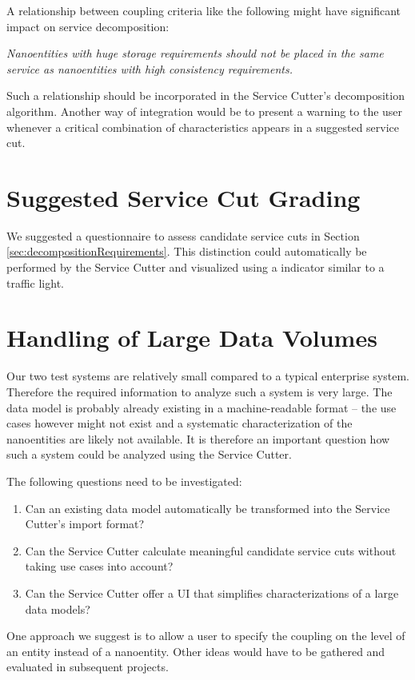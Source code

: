 A relationship between coupling criteria like the following might have significant impact on service decomposition:

\textit{Nanoentities with huge storage requirements should not be placed in the same service as nanoentities with high consistency requirements.}

Such a relationship should be incorporated in the Service Cutter's decomposition algorithm. Another way of integration would be to present a warning to the user whenever a critical combination of characteristics appears in a suggested service cut.

\section{Suggested Service Cut Grading}
\label{sec:suggested-cut-grades}

We suggested a questionnaire to assess candidate service cuts in Section \ref{sec:decompositionRequirements}. This distinction could automatically be performed by the Service Cutter and visualized using a indicator similar to a traffic light.

\section{Handling of Large Data Volumes}

Our two test systems are relatively small compared to a typical enterprise system. Therefore the required information to analyze such a system is very large. The data model is probably already existing in a machine-readable format -- the use cases however might not exist and a systematic characterization of the nanoentities are likely not available. It is therefore an important question how such a system could be analyzed using the Service Cutter.

The following questions need to be investigated:

\begin{enumerate}
\item Can an existing data model automatically be transformed into the Service Cutter's import format?
\item Can the Service Cutter calculate meaningful candidate service cuts without taking use cases into account?
\item Can the Service Cutter offer a \gls{UI} that simplifies characterizations of a large data models?
\end{enumerate}

One approach we suggest is to allow a user to specify the coupling on the level of an entity instead of a nanoentity. Other ideas would have to be gathered and evaluated in subsequent projects.
